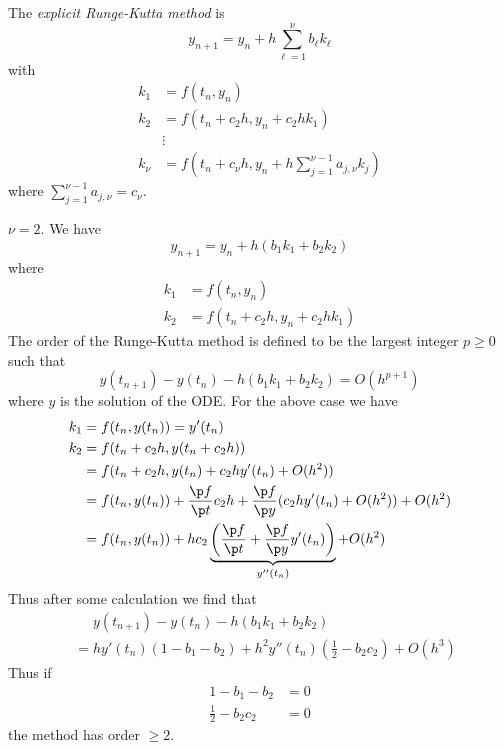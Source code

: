 \documentclass[a4paper]{article}
\begin{document}
The \emph{explicit Runge-Kutta method} is
\[
  y_{n + 1} = y_n + h \sum_{\ell = 1}^\nu b_\ell k_\ell
\]
with
\begin{align*}
  k_1 &= f(t_n, y_n) \\
  k_2 &= f(t_n + c_2h, y_n + c_2hk_1) \\
      &\vdots \\
  k_\nu &= f(t_n + c_\nu h, y_n + h \sum_{j = 1}^{\nu - 1} a_{j, \nu} k_j)
\end{align*}
where \(\sum_{j = 1}^{\nu - 1} a_{j, \nu} = c_\nu\).

\begin{eg}
  \(\nu = 2\). We have
  \[
    y_{n + 1} = y_n + h(b_1k_1 + b_2k_2)
  \]
  where
  \begin{align*}
    k_1 &= f(t_n, y_n) \\
    k_2 &= f(t_n + c_2h, y_n + c_2hk_1)
  \end{align*}
  The order of the Runge-Kutta method is defined to be the largest integer \(p \geq 0\) such that
  \[
    y(t_{n + 1}) - y(t_n) - h(b_1k_1 + b_2k_2) = O(h^{p + 1})
  \]
  where \(y\) is the solution of the ODE. For the above case we have
  \begin{align*}
    k_1 &= f(t_n, y(t_n)) = y'(t_n) \\
    k_2 &= f(t_n + c_2h, y(t_n + c_2h)) \\
        &= f(t_n + c_2h, y(t_n) + c_2hy'(t_n) + O(h^2)) \\
        &= f(t_n, y(t_n)) + \frac{\p f}{\p t} c_2h + \frac{\p f}{\p y} (c_2hy'(t_n) + O(h^2)) + O(h^2) \\
        &= f(t_n, y(t_n)) + hc_2 \underbrace{\left( \frac{\p f}{\p t} + \frac{\p f}{\p y} y'(t_n) \right)}_{y''(t_n)} + O(h^2)
  \end{align*}
  Thus after some calculation we find that
  \begin{align*}
    &\phantom{={}}y(t_{n + 1}) - y(t_n) - h(b_1k_1 + b_2k_2) \\
    &= hy'(t_n)(1 - b_1 - b_2) + h^2y''(t_n)(\frac{1}{2} - b_2c_2) + O(h^3)
  \end{align*}
  Thus if
  \begin{align*}
    1 - b_1 - b_2 &= 0 \\
    \frac{1}{2} - b_2c_2 &= 0
  \end{align*}
  the method has order \(\geq 2\).
\end{eg}
\end{document}
